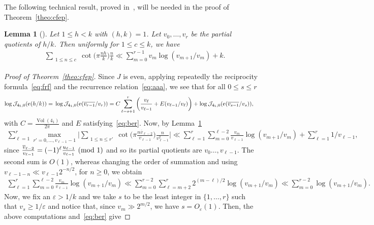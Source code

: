 \documentclass[11pt]{amsart}
\newcommand{\eps}{\varepsilon}
\newcommand{\J}{\mathcal{J}}
\renewcommand{\mod}[1]{~\pr{\textnormal{mod}~#1}}
\newtheorem{lemma}{Lemma}
\theoremstyle{definition}
\newcommand{\ssum}[1]{\sum_{\substack{#1}}}
\newcommand{\pr}[1]{\mathchoice{\left( #1\right)}{(#1)}{(#1)}{(#1)}}
\newcommand{\e}[1][]{\ifthenelse{\equal{#1}{}}{{\rm e}}{\operatorname{e}\pr{ #1}}}
\DeclareMathOperator{\Vol}{Vol}
\newcommand{\1}{{\mathbf 1}}
\let\originalleft\left
\let\originalright\right
\renewcommand{\left}{\mathopen{}\mathclose\bgroup\originalleft}
\renewcommand{\right}{\aftergroup\egroup\originalright}
\numberwithin{equation}{section}
\begin{document}
The following technical result, proved in~\cite{BettinDrappeaub}, will be needed in the proof of Theorem~\ref{theo:cfep}.

\begin{lemma}[{\cite[Theorem~1]{BettinDrappeaub}}]\label{parcot}
  Let $1\leq h<k$ with $(h,k)=1$. Let $v_0,\dots,v_r$ be the partial quotients of $h/k$. Then uniformly for $1\leq c\leq k$, we have
  \begin{align*}
    &\ssum{1\leq n\leq c}\cot\Big(\pi\frac{n h }k\Big)\frac{ n}{k}\ll \sum_{m=0}^{r-1} v_m\log(v_{m+1}/v_{m})+k.
  \end{align*}
\end{lemma}


\begin{proof}[Proof of Theorem~\ref{theo:cfep}]
  Since $J$ is even, applying repeatedly the reciprocity formula~\eqref{eq:frf} and the recurrence relation~\eqref{eq:aaa}, we see that for all $0\leq s\leq r$
  \begin{align*}
    \log \J_{4_1,0}(\e[ { h}/k]) = {}& \log \J_{4_1,0}(\e[ \overline{ v_{r-1}}/v_r]) = C\sum_{\ell=s+1}^{r}\bigg(\frac{v_{\ell}}{v_{\ell-1}}+E({v_{\ell-1}}/{v_{\ell}})\bigg)+    \log \J_{4_1,0}(\e[ \overline{ v_{s-1}}/v_{s}]),
  \end{align*}
  with $C=\frac{\Vol(4_1)}{2\pi}$ and $E$ satisfying~\eqref{eq:ber}.    Now, by Lemma~\ref{parcot}
  \begin{align*}
    \sum_{\ell=1}^{r}\max_{r'=0,\dots,v_{\ell-1}-1}\Big|\ssum{1\leq n\leq r'}\cot\Big(\pi\frac{n\overline v_{\ell-2} }{v_{\ell-1}}\Big)\frac{ n}{v_{\ell-1}^2}\Big|\ll
    \sum_{\ell=1}^{r} \sum_{m=0}^{\ell-2} \frac{v_m}{v_{\ell-1}}\log(v_{m+1}/v_{m})+\sum_{\ell=1}^{r}1/v_{\ell-1},
  \end{align*}
  since $\tfrac{\overline v_{\ell-2} }{v_{\ell-1}}=(-1)^{\ell}\tfrac{u_{\ell-1} }{v_{\ell-1}}\mod 1$ and so its partial quotients are $v_0\dots,v_{\ell-1}$. The second sum is $O(1)$, whereas changing the order of summation and using $v_{\ell-1-n}\ll  v_{\ell-1}2^{-n/2}$, for $n\geq0$,
  we obtain
  \begin{align*}
    \sum_{\ell=1}^{r} \sum_{m=0}^{\ell-2} \frac{v_m}{v_{\ell-1}}\log(v_{m+1}/v_{m})\ll  \sum_{m=0}^{r-2} \sum_{\ell=m+2}^{r}  2^{(m-\ell)/2}\log(v_{m+1}/v_{m})\ll\sum_{m=0}^{r-2} \log(v_{m+1}/v_{m}).
  \end{align*}
  Now, we fix an $\eps>1/k$ and we take $s$ to be the least integer in $\{1,\dots,r\}$ such that  $v_{s}\geq1/\eps$ and notice that, since $v_m\gg 2^{m/2}$, we have $s=O_\eps(1)$. Then, the above computations and~\eqref{eq:ber} give

\end{proof}
\end{document}
